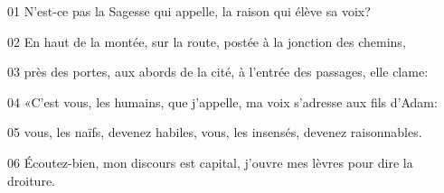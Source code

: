 01 N’est-ce pas la Sagesse qui appelle, la raison qui élève sa voix?

02 En haut de la montée, sur la route, postée à la jonction des chemins,

03 près des portes, aux abords de la cité, à l’entrée des passages, elle clame:

04 «C’est vous, les humains, que j’appelle, ma voix s’adresse aux fils d’Adam:

05 vous, les naïfs, devenez habiles, vous, les insensés, devenez raisonnables.

06 Écoutez-bien, mon discours est capital, j’ouvre mes lèvres pour dire la droiture.
